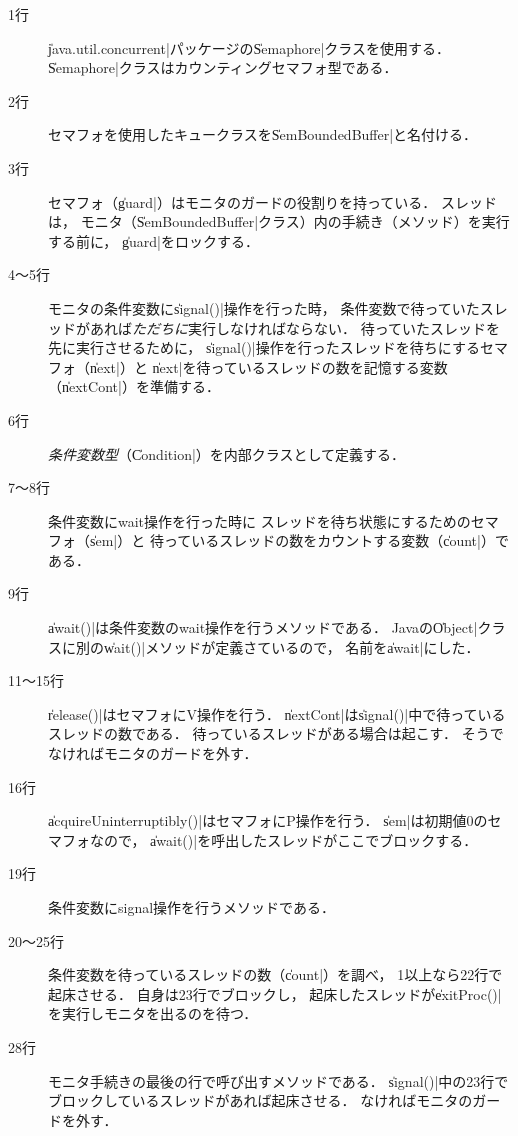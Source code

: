 \begin{description}
\item [1行]
  \|java.util.concurrent|パッケージの\|Semaphore|クラスを使用する．
  \|Semaphore|クラスはカウンティングセマフォ型である．
\item [2行]
  セマフォを使用したキュークラスを\|SemBoundedBuffer|と名付ける．
\item [3行]
  セマフォ（\|guard|）はモニタのガードの役割りを持っている．
  スレッドは，
  モニタ（\|SemBoundedBuffer|クラス）内の手続き（メソッド）を実行する前に，
  \|guard|をロックする．
\item [4〜5行]
  モニタの条件変数に\|signal()|操作を行った時，
  条件変数で待っていたスレッドがあれば\emph{ただちに}実行しなければならない．
  待っていたスレッドを先に実行させるために，
  \|signal()|操作を行ったスレッドを待ちにするセマフォ（\|next|）と
  \|next|を待っているスレッドの数を記憶する変数（\|nextCont|）を準備する．
\item [6行]
  \emph{条件変数型}（\|Condition|）を内部クラスとして定義する．
\item [7〜8行]
  条件変数にwait操作を行った時に
  スレッドを待ち状態にするためのセマフォ（\|sem|）と
  待っているスレッドの数をカウントする変数（\|count|）である．
\item [9行]
  \|await()|は条件変数のwait操作を行うメソッドである．
  Javaの\|Object|クラスに別の\|wait()|メソッドが定義さているので，
  名前を\|await|にした．
\item [11〜15行]
  \|release()|はセマフォにV操作を行う．
  \|nextCont|は\|signal()|中で待っているスレッドの数である．
  待っているスレッドがある場合は起こす．
  そうでなければモニタのガードを外す．
\item [16行]
  \|acquireUninterruptibly()|はセマフォにP操作を行う．
  \|sem|は初期値0のセマフォなので，
  \|await()|を呼出したスレッドがここでブロックする．
\item [19行]
  条件変数にsignal操作を行うメソッドである．
\item [20〜25行]
  条件変数を待っているスレッドの数（\|count|）を調べ，
  1以上なら22行で起床させる．
  自身は23行でブロックし，
  起床したスレッドが\|exitProc()|を実行しモニタを出るのを待つ．
\item [28行]
  モニタ手続きの最後の行で呼び出すメソッドである．
  \|signal()|中の23行でブロックしているスレッドがあれば起床させる．
  なければモニタのガードを外す．
\end{description}


